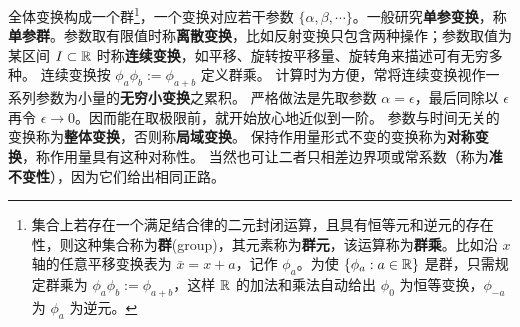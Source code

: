 全体变换构成一个群\footnote{集合上若存在一个满足结合律的二元封闭运算，且具有恒等元和逆元的存在性，则这种集合称为\textbf{群}(group)，其元素称为\textbf{群元}，该运算称为\textbf{群乘}。比如沿 $x$ 轴的任意平移变换表为 $\bar x=x+a$，记作 $\phi_a$。为使 $\{\phi_a:a\in\mathbb{R}\}$ 是群，只需规定群乘为 $\phi_a\phi_b:=\phi_{a+b}$，这样 $\mathbb{R}$ 的加法和乘法自动给出 $\phi_0$ 为恒等变换，$\phi_{-a}$ 为 $\phi_{a}$ 为逆元。}，一个变换对应若干参数 $\{\alpha,\beta,\cdots\}$。一般研究\textbf{单参变换}，称\textbf{单参群}。参数取有限值时称\textbf{离散变换}，比如反射变换只包含两种操作；参数取值为某区间 $I\subset\mathbb{R}$ 时称\textbf{连续变换}，如平移、旋转按平移量、旋转角来描述可有无穷多种。
连续变换按 $\phi_a\phi_b:=\phi_{a+b}$ 定义群乘。
计算时为方便，常将连续变换视作一系列参数为小量的\textbf{无穷小变换}之累积。
严格做法是先取参数 $\alpha=\epsilon$，最后同除以 $\epsilon$ 再令 $\epsilon\to 0$。因而能在取极限前，就开始放心地近似到一阶。
参数与时间无关的变换称为\textbf{整体变换}，否则称\textbf{局域变换}。
保持作用量形式不变的变换称为\textbf{对称变换}，称作用量具有这种对称性。
当然也可让二者只相差边界项或常系数（称为\textbf{准不变性}），因为它们给出相同正路。

